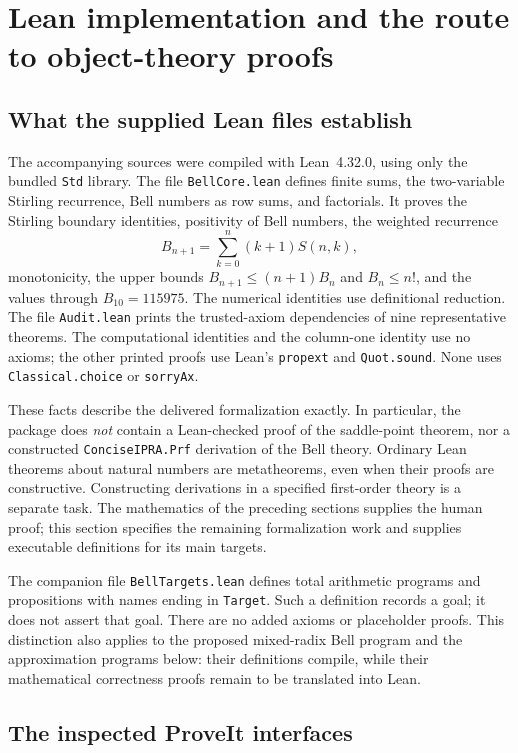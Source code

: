 \section{Lean implementation and the route to object-theory proofs}
\label{sec:formalization}

\subsection{What the supplied Lean files establish}

The accompanying sources were compiled with Lean~4.32.0, using only the
bundled \texttt{Std} library. The file \texttt{BellCore.lean} defines finite
sums, the two-variable Stirling recurrence, Bell numbers as row sums, and
factorials. It proves the Stirling boundary identities, positivity of Bell
numbers, the weighted recurrence
\[
 B_{n+1}=\sum_{k=0}^{n}(k+1)S(n,k),
\]
monotonicity, the upper bounds $B_{n+1}\le(n+1)B_n$ and $B_n\le n!$, and
the values through $B_{10}=115975$. The numerical identities use
definitional reduction. The file \texttt{Audit.lean} prints the trusted-axiom
dependencies of nine representative theorems. The computational identities
and the column-one identity use no axioms; the other printed proofs use
Lean's \texttt{propext} and \texttt{Quot.sound}. None uses
\texttt{Classical.choice} or \texttt{sorryAx}.

These facts describe the delivered formalization exactly. In particular,
the package does \emph{not} contain a Lean-checked proof of the saddle-point
theorem, nor a constructed \texttt{ConciseIPRA.Prf} derivation of the Bell
theory. Ordinary Lean theorems about natural numbers are metatheorems, even
when their proofs are constructive. Constructing derivations in a specified
first-order theory is a separate task. The mathematics of the preceding
sections supplies the human proof; this section specifies the remaining
formalization work and supplies executable definitions for its main targets.

The companion file \texttt{BellTargets.lean} defines total arithmetic
programs and propositions with names ending in \texttt{Target}. Such a definition records a
goal; it does not assert that goal. There are no added axioms or placeholder
proofs. This distinction also applies to the proposed mixed-radix Bell
program and the approximation programs below: their definitions compile,
while their mathematical correctness proofs remain to be translated into
Lean.

\subsection{The inspected ProveIt interfaces}

